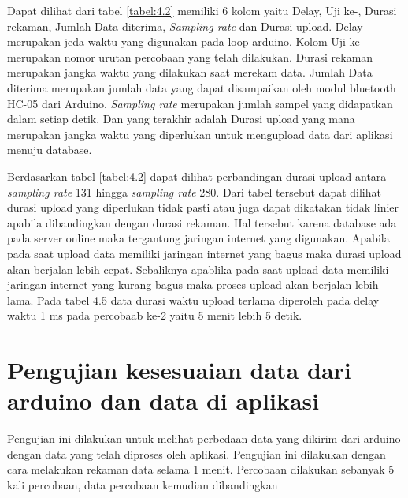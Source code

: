 \begin{table}[H]
	\label{tabel:4.2}
\end{table}

Dapat dilihat dari tabel \ref{tabel:4.2} memiliki 6 kolom yaitu Delay,
Uji ke-, Durasi rekaman, Jumlah Data diterima,\textit{ Sampling rate} dan
Durasi upload. Delay merupakan jeda waktu yang digunakan pada
loop arduino. Kolom Uji ke- merupakan nomor urutan percobaan
yang telah dilakukan. Durasi rekaman merupakan jangka waktu
yang dilakukan saat merekam data. Jumlah Data diterima merupakan jumlah data yang dapat disampaikan oleh modul bluetooth
HC-05 dari Arduino. \textit{Sampling rate} merupakan jumlah sampel yang
didapatkan dalam setiap detik. Dan yang terakhir adalah Durasi
upload yang mana merupakan jangka waktu yang diperlukan untuk
mengupload data dari aplikasi menuju database.


Berdasarkan tabel \ref{tabel:4.2} dapat dilihat perbandingan durasi upload antara \textit{sampling rate} 131 hingga \textit{sampling rate} 280. Dari tabel
tersebut dapat dilihat durasi upload yang diperlukan tidak pasti
atau juga dapat dikatakan tidak linier apabila dibandingkan dengan durasi rekaman. Hal tersebut karena database ada pada server
online maka tergantung jaringan internet yang digunakan. Apabila
pada saat upload data memiliki jaringan internet yang bagus maka
durasi upload akan berjalan lebih cepat. Sebaliknya apablika pada saat upload data memiliki jaringan internet yang kurang bagus
maka proses upload akan berjalan lebih lama. Pada tabel 4.5 data
durasi waktu upload terlama diperoleh pada delay waktu 1 ms pada
percobaab ke-2 yaitu 5 menit lebih 5 detik.

\section{Pengujian kesesuaian data dari arduino dan data di aplikasi}
\vspace{1ex}
Pengujian ini dilakukan untuk melihat perbedaan data yang dikirim dari arduino dengan data yang telah diproses oleh aplikasi. Pengujian ini dilakukan dengan cara melakukan rekaman data selama 1 menit. Percobaan dilakukan sebanyak 5 kali percobaan, data percobaan kemudian dibandingkan 

